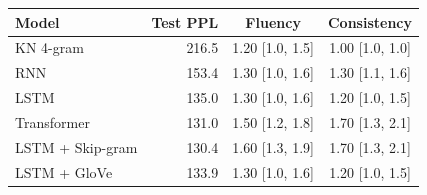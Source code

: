 \begin{tabular}{lrcc}
\toprule
Model & Test PPL & Fluency & Consistency \\
\midrule
KN 4-gram & 216.5 & 1.20 [1.0, 1.5] & 1.00 [1.0, 1.0] \\
RNN & 153.4 & 1.30 [1.0, 1.6] & 1.30 [1.1, 1.6] \\
LSTM & 135.0 & 1.30 [1.0, 1.6] & 1.20 [1.0, 1.5] \\
Transformer & 131.0 & 1.50 [1.2, 1.8] & 1.70 [1.3, 2.1] \\
LSTM + Skip-gram & 130.4 & 1.60 [1.3, 1.9] & 1.70 [1.3, 2.1] \\
LSTM + GloVe & 133.9 & 1.30 [1.0, 1.6] & 1.20 [1.0, 1.5] \\
\bottomrule
\end{tabular}
